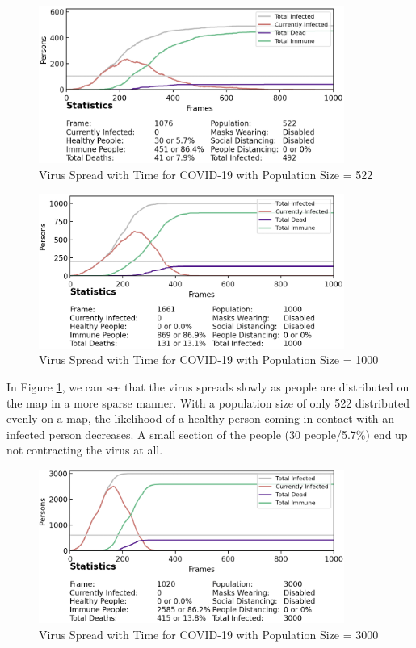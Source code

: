 \documentclass[11pt]{article}
\begin{document}
 \begin{figure}[H]
    \centering
    \includegraphics[width=10cm]{figures/population_denisty_522.png}
    \caption{Virus Spread with Time for COVID-19 with Population Size = 522}
    \label{population_denisty_522}
\end{figure}

\begin{figure}[H]
    \centering
    \includegraphics[width=10cm]{figures/population_density_1000.png}
    \caption{Virus Spread with Time for COVID-19 with Population Size = 1000}
    \label{population_density_1000}
\end{figure}

In Figure \ref{population_denisty_522}, we can see that the virus spreads slowly as people are distributed on the map in a more sparse manner. With a population size of only 522 distributed evenly on a map, the likelihood of a healthy person coming in contact with an infected person decreases. A small section of the people (30 people/5.7\%) end up not contracting the virus at all. 

\begin{figure}[H]
    \centering
    \includegraphics[width=10cm]{figures/population_density_3000.png}
    \caption{Virus Spread with Time for COVID-19 with Population Size = 3000}
    \label{population_density_3000}
\end{figure}
\end{document}
